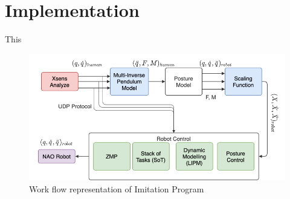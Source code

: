 \chapter{Implementation}

This
\begin{figure}[h!]
    \centering
    \includegraphics[scale=0.55]{images/flowchart-block-diagram.png}\hfill
    \caption{Work flow representation of Imitation Program}\hfill
    \label{fig: block-diagram}
\end{figure}